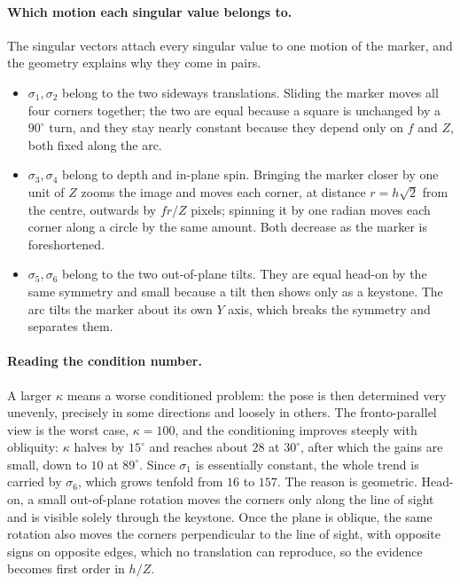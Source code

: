 \documentclass[11pt,a4paper]{article}
\theoremstyle{definition}
\theoremstyle{plain}
\theoremstyle{remark}
\begin{document}
\paragraph{Which motion each singular value belongs to.} The singular vectors
attach every singular value to one motion of the marker, and the geometry
explains why they come in pairs.
\begin{itemize}[leftmargin=*]
  \item $\sigma_1,\sigma_2$ belong to the two sideways translations. Sliding the
        marker moves all four corners together; the two are equal because a
        square is unchanged by a $90^\circ$ turn, and they stay nearly constant
        because they depend only on $f$ and $Z$, both fixed along the arc.
  \item $\sigma_3,\sigma_4$ belong to depth and in-plane spin. Bringing the
        marker closer by one unit of $Z$ zooms the image and moves each corner,
        at distance $r = h\sqrt2$ from the centre, outwards by $fr/Z$ pixels;
        spinning it by one radian moves each corner along a circle by the same
        amount. Both decrease as the marker is foreshortened.
  \item $\sigma_5,\sigma_6$ belong to the two out-of-plane tilts. They are equal
        head-on by the same symmetry and small because a tilt then shows only as
        a keystone. The arc tilts the marker about its own $Y$ axis, which breaks
        the symmetry and separates them.
\end{itemize}

\paragraph{Reading the condition number.} A larger $\kappa$ means a worse
conditioned problem: the pose is then determined very unevenly, precisely in
some directions and loosely in others. The fronto-parallel view is the worst
case, $\kappa = 100$, and the conditioning improves steeply with obliquity:
$\kappa$ halves by $15^\circ$ and reaches about $28$ at $30^\circ$, after which
the gains are small, down to $10$ at $89^\circ$. Since $\sigma_1$ is essentially
constant, the whole trend is carried by $\sigma_6$, which grows tenfold from
$16$ to $157$. The reason is geometric. Head-on, a small out-of-plane rotation
moves the corners only along the line of sight and is visible solely through the
keystone. Once the plane is oblique, the same rotation also moves the corners
perpendicular to the line of sight, with opposite signs on opposite edges, which
no translation can reproduce, so the evidence becomes first order in $h/Z$.
\end{document}
